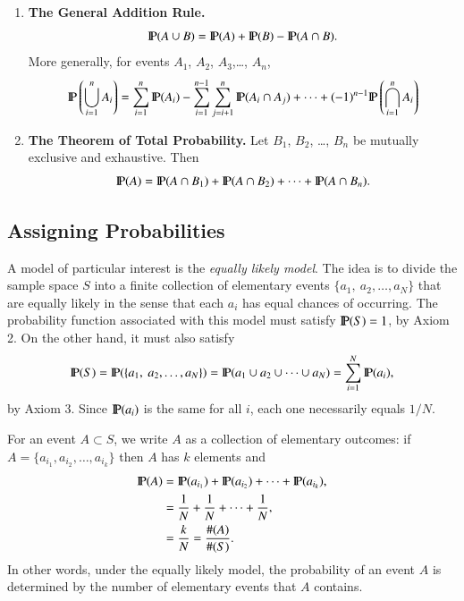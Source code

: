 \documentclass[captions=tableheading]{scrbook}
\begin{document}
\begin{enumerate}
\item \textbf{The General Addition Rule.}
  \begin{equation}
  \P(A\cup B)=\P(A)+\P(B)-\P(A\cap B).\label{eq:general-addition-rule-1}
  \end{equation}
  More generally, for events \(A_{1}\), \(A_{2}\), \(A_{3}\),\ldots{}, \(A_{n}\),
  \begin{equation}
  \P\left(\bigcup_{i=1}^{n}A_{i}\right)=\sum_{i=1}^{n}\P(A_{i})-\sum_{i=1}^{n-1}\sum_{j=i+1}^{n}\P(A_{i}\cap A_{j})+\cdots+(-1)^{n-1}\P\left(\bigcap_{i=1}^{n}A_{i}\right)
  \end{equation}
\item \textbf{The Theorem of Total Probability.} 
  Let \(B_{1}\), \(B_{2}\), \ldots{}, \(B_{n}\) be mutually exclusive and exhaustive. Then
  \begin{equation}
  \P(A)=\P(A\cap B_{1})+\P(A\cap B_{2})+\cdots+\P(A\cap B_{n}).\label{eq:theorem-total-probability}
  \end{equation}
\end{enumerate}
\subsection{Assigning Probabilities}
\label{sec-4-4-3}


A model of particular interest is the \emph{equally likely model}. The idea is to divide the sample space \(S\) into a finite collection of elementary events \( \{ a_{1},\ a_{2}, \ldots, a_{N} \} \) that are equally likely in the sense that each \(a_{i}\) has equal chances of occurring. The probability function associated with this model must satisfy \(\P(S)=1\), by Axiom 2. On the other hand, it must also satisfy
\[
\P(S)=\P( \{ a_{1},\ a_{2},\ldots,a_{N} \} )=\P(a_{1}\cup a_{2}\cup\cdots\cup a_{N})=\sum_{i=1}^{N}\P(a_{i}),
\]
by Axiom 3. Since \(\P(a_{i})\) is the same for all \(i\), each one necessarily equals \(1/N\). 

For an event \(A\subset S\), we write \(A\) as a collection of elementary outcomes: if \( A = \{ a_{i_{1}}, a_{i_{2}}, \ldots, a_{i_{k}} \} \) then \(A\) has \(k\) elements and 
\begin{align*}
\P(A) & =\P(a_{i_{1}})+\P(a_{i_{2}})+\cdots+\P(a_{i_{k}}),\\
 & =\frac{1}{N}+\frac{1}{N}+\cdots+\frac{1}{N},\\  & =\frac{k}{N}=\frac{\#(A)}{\#(S)}.
\end{align*}
In other words, under the equally likely model, the probability of an event \(A\) is determined by the number of elementary events that \(A\) contains. 
\end{document}
